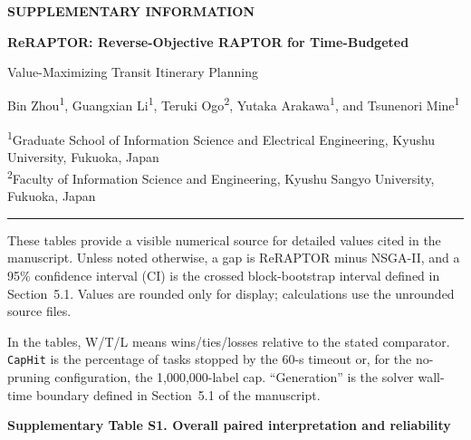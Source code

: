 \documentclass[10pt,a4paper]{article}
\newcommand{\suppheading}[2]{%
  \par\needspace{7\baselineskip}\vspace{8pt}%
  {\large\bfseries Supplementary #1. #2}\par\vspace{5pt}}
\begin{document}
\begin{center}
{\small\bfseries SUPPLEMENTARY INFORMATION}\par\vspace{6pt}
{\LARGE\bfseries ReRAPTOR: Reverse-Objective RAPTOR for Time-Budgeted\par
Value-Maximizing Transit Itinerary Planning}\par\vspace{8pt}
{\large Bin Zhou\textsuperscript{1}, Guangxian Li\textsuperscript{1},
Teruki Ogo\textsuperscript{2}, Yutaka Arakawa\textsuperscript{1}, and
Tsunenori Mine\textsuperscript{1}}\par\vspace{5pt}
{\small
\textsuperscript{1}Graduate School of Information Science and Electrical Engineering,
Kyushu University, Fukuoka, Japan\\
\textsuperscript{2}Faculty of Information Science and Engineering,
Kyushu Sangyo University, Fukuoka, Japan}
\end{center}
\vspace{4pt}\hrule\vspace{8pt}

These tables provide a visible numerical source for detailed values cited in
the manuscript. Unless noted otherwise, a gap is ReRAPTOR minus NSGA-II, and a
95\% confidence interval (CI) is the crossed block-bootstrap interval defined
in Section~5.1. Values are rounded only for display; calculations use the
unrounded source files.

In the tables, W/T/L means wins/ties/losses relative to the stated comparator.
\texttt{CapHit} is the percentage of tasks stopped by the 60-s timeout or, for
the no-pruning configuration, the 1,000,000-label cap. ``Generation'' is the
solver wall-time boundary defined in Section~5.1 of the manuscript.

\suppheading{Table S1}{Overall paired interpretation and reliability}
\end{document}
